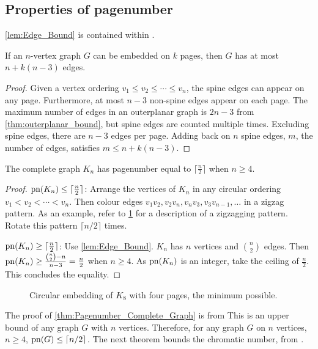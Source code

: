 \subsection{Properties of pagenumber}\label{ssec:Related_Properties}
\cref{lem:Edge_Bound} is contained within \textcite{bernhartBookThicknessGraph1979}.
\begin{proposition}\label{lem:Edge_Bound}
	If an \(n\)-vertex graph \(G\) can be embedded on $k$ pages, then \(G\) has at most \(n + k(n-3)\) edges.
\end{proposition}
\begin{proof}
	Given a vertex ordering \(v_1 \leq v_2 \leq \cdots \leq v_n\), the spine edges can appear on any page. Furthermore, at most \(n-3\) non-spine edges appear on each page. The maximum number of edges in an outerplanar graph is \(2n - 3\) from \cref{thm:outerplanar_bound}, but spine edges are counted multiple times. Excluding spine edges, there are $n-3$ edges per page. Adding back on $n$ spine edges, \(m\), the number of edges, satisfies \(m \leq n + k (n - 3)\).
\end{proof}
\begin{proposition}\label{thm:Pagenumber_Complete_Graph}
	The complete graph $K_n$ has pagenumber equal to  $\lceil \frac{n}{2} \rceil$ when $n \geq 4$.
\end{proposition}
\begin{proof}
	$\operatorname{pn}(K_n) \leq \lceil \frac{n}{2} \rceil$: Arrange the vertices of $K_n$ in any circular ordering $v_1 < v_2 < \cdots < v_n$. Then colour edges $v_1 v_2, v_2 v_{n}, v_{n} v_{3}, v_{3} v_{n-1}, \ldots$ in a zigzag pattern. As an example, refer to \cref{fig:k8 coloured with colours} for a description of a zigzagging pattern. Rotate this pattern $\lceil n/2 \rceil$ times. 
	\par
	$\operatorname{pn}(K_n) \geq \lceil \frac{n}{2} \rceil$: Use \cref{lem:Edge_Bound}. \(K_n\) has \(n\) vertices and \(\binom{n}{2}\) edges. Then \(\operatorname{pn}(K_n) \geq \frac{\binom{n}{2} - n}{n - 3} = \frac{n}{2}\) when \(n \geq 4\). As \(\operatorname{pn}(K_n)\) is an integer, take the ceiling of \(\frac{n}{2}\). This concludes the equality.
\end{proof}
\begin{figure}[ht]
	\centering
	
	\caption[Embedding $K_8$ on four pages]{Circular embedding of \(K_8\) with four pages, the minimum possible.}\label{fig:k8 coloured with colours}
\end{figure}
The proof of \cref{thm:Pagenumber_Complete_Graph} is from \textcite{bernhartBookThicknessGraph1979}
This is an upper bound of any graph \(G\) with \(n\) vertices.
Therefore, for any graph \(G\) on \(n\) vertices, \(n \geq 4\), \(\operatorname{pn}(G) \leq \lceil n/2 \rceil\). The next theorem bounds the chromatic number, from \textcite{bernhartBookThicknessGraph1979}.

